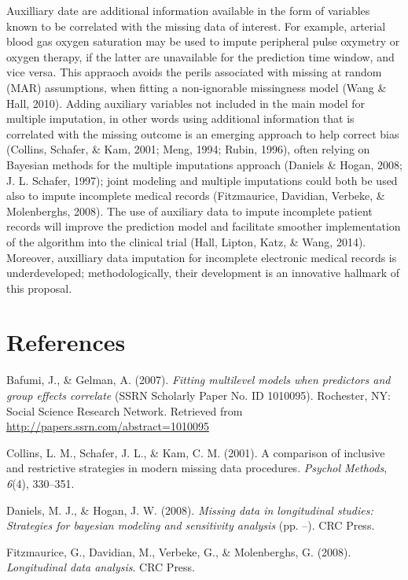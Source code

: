 \documentclass[]{article}
\begin{document}
Auxilliary date are additional information available in the form of
variables known to be correlated with the missing data of interest. For
example, arterial blood gas oxygen saturation may be used to impute
peripheral pulse oxymetry or oxygen therapy, if the latter are
unavailable for the prediction time window, and vice versa. This
appraoch avoids the perils associated with missing at random (MAR)
assumptions, when fitting a non-ignorable missingness model (Wang \&
Hall, 2010). Adding auxiliary variables not included in the main model
for multiple imputation, in other words using additional information
that is correlated with the missing outcome is an emerging approach to
help correct bias (Collins, Schafer, \& Kam, 2001; Meng, 1994; Rubin,
1996), often relying on Bayesian methods for the multiple imputations
approach (Daniels \& Hogan, 2008; J. L. Schafer, 1997); joint modeling
and multiple imputations could both be used also to impute incomplete
medical records (Fitzmaurice, Davidian, Verbeke, \& Molenberghs, 2008).
The use of auxiliary data to impute incomplete patient records will
improve the prediction model and facilitate smoother implementation of
the algorithm into the clinical trial (Hall, Lipton, Katz, \& Wang,
2014). Moreover, auxilliary data imputation for incomplete electronic
medical records is underdeveloped; methodologically, their development
is an innovative hallmark of this proposal.

\section*{References}\label{references}

Bafumi, J., \& Gelman, A. (2007). \emph{Fitting multilevel models when
predictors and group effects correlate} (SSRN Scholarly Paper No. ID
1010095). Rochester, NY: Social Science Research Network. Retrieved from
\url{http://papers.ssrn.com/abstract=1010095}

Collins, L. M., Schafer, J. L., \& Kam, C. M. (2001). A comparison of
inclusive and restrictive strategies in modern missing data procedures.
\emph{Psychol Methods}, \emph{6}(4), 330--351.

Daniels, M. J., \& Hogan, J. W. (2008). \emph{Missing data in
longitudinal studies: Strategies for bayesian modeling and sensitivity
analysis} (pp. --). CRC Press.

Fitzmaurice, G., Davidian, M., Verbeke, G., \& Molenberghs, G. (2008).
\emph{Longitudinal data analysis}. CRC Press.
\end{document}
